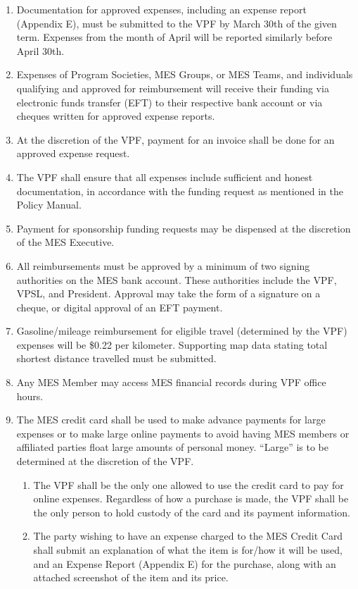 \begin{enumerate}
 \item
  Documentation for approved expenses, including an expense report (Appendix E), must be submitted to the VPF by March 30th of the given term. Expenses from the month of April will be reported similarly before April 30th. %
 \item
  Expenses of Program Societies, MES Groups, or MES Teams, and individuals qualifying and approved for reimbursement will receive their funding via electronic funds transfer (EFT) to their respective bank account or via cheques written for approved expense reports.
 \item
  At the discretion of the VPF, payment for an invoice shall be done for an approved expense request.
 \item
  The VPF shall ensure that all expenses include sufficient and honest documentation, in accordance with the funding request as mentioned in the Policy Manual.
 \item
  Payment for sponsorship funding requests may be dispensed at the discretion of the MES Executive.
 \item
  All reimbursements must be approved by a minimum of two signing authorities on the MES bank account. These authorities include the VPF, VPSL, and President. Approval may take the form of a signature on a cheque, or digital approval of an EFT payment.
 \item
  Gasoline/mileage reimbursement for eligible travel (determined by the VPF) expenses will be \$0.22 per kilometer. Supporting map data stating total shortest distance travelled must be submitted.
 \item
  Any MES Member may access MES financial records during VPF office hours.
 \item
  The MES credit card shall be used to make advance payments for large expenses or to make large online payments to avoid having MES members or affiliated parties float large amounts of personal money. ``Large'' is to be determined at the discretion of the VPF.

  \begin{enumerate}
   \item
    The VPF shall be the only one allowed to use the credit card to pay for online expenses. Regardless of how a purchase is made, the VPF shall be the only person to hold custody of the card and its payment information.
   \item
    The party wishing to have an expense charged to the MES Credit Card shall submit an explanation of what the item is for/how it will be used, and an Expense Report (Appendix E) for the purchase, along with an attached screenshot of the item and its price.
  \end{enumerate}
\end{enumerate}

